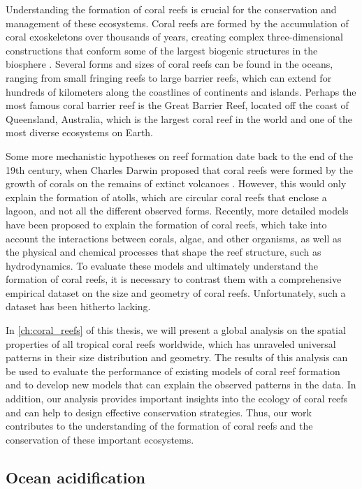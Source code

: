 Understanding the formation of coral reefs is crucial for the conservation
and
management of these ecosystems. Coral reefs are formed by the accumulation of
coral exoskeletons over thousands of years, creating complex
three-dimensional
constructions that conform some of the largest biogenic structures in the
biosphere \cite{wiener2021exploration}. Several forms and sizes of coral
reefs
can be found in the oceans, ranging from small fringing reefs to large
barrier
reefs, which can extend for hundreds of kilometers along the coastlines of
continents and islands. Perhaps the most famous coral barrier reef is the
Great Barrier Reef, located off the coast of Queensland, Australia, which is
the largest coral reef in the world and one of the most diverse ecosystems on
Earth.

Some more mechanistic hypotheses on reef formation date back to the end of
the
19th century, when Charles Darwin proposed that coral reefs were formed by
the
growth of corals on the remains of extinct volcanoes
\cite{darwin1874structure}. However, this would only explain the formation of
atolls, which are circular coral reefs that enclose a lagoon, and not all the
different observed forms. Recently, more detailed models have been proposed
to explain the formation of coral reefs, which take into account the
interactions between corals, algae, and other organisms, as well as the
physical and chemical processes that shape the reef structure, such as
hydrodynamics. To evaluate these models and ultimately understand the
formation of coral reefs, it is necessary to contrast them with a
comprehensive
empirical dataset on the size and geometry of coral reefs. Unfortunately,
such
a dataset has been hitherto lacking.

In \cref{ch:coral_reefs} of this thesis, we will present a global analysis on
the spatial properties of all tropical coral reefs worldwide, which has
unraveled universal patterns in their size distribution and geometry. The
results of this analysis can be used to evaluate the performance of existing
models of coral reef formation and to develop new models that can explain the
observed patterns in the data. In addition, our analysis provides important
insights into the ecology of coral reefs and can help to design effective
conservation strategies. Thus, our work contributes to the understanding of
the
formation of coral reefs and the conservation of these important ecosystems.

\subsection{\label{sec:Ocean acidification} Ocean acidification}

